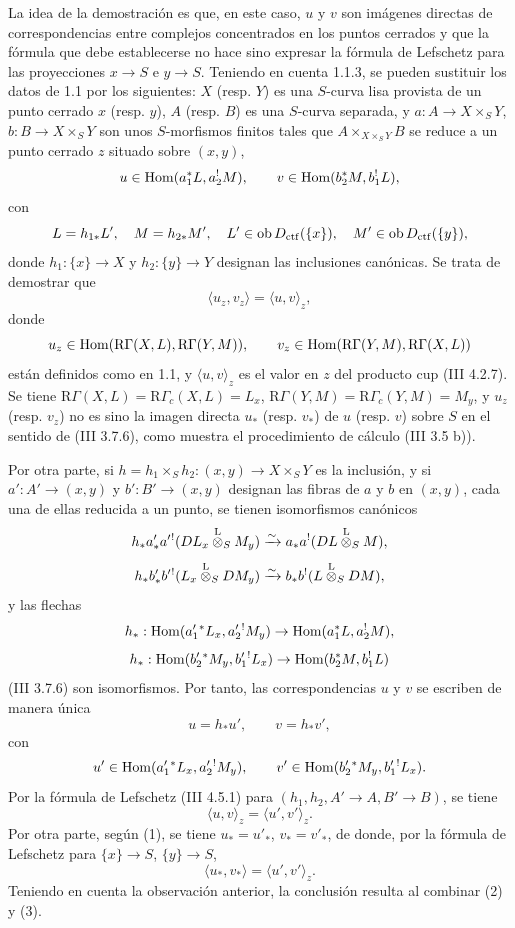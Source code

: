 La idea de la demostración es que, en este caso, $u$ y $v$ son imágenes directas de correspondencias entre complejos concentrados en los puntos cerrados y que la fórmula que debe establecerse no hace sino expresar la fórmula de Lefschetz para las proyecciones $x\to S$ e $y\to S$. Teniendo en cuenta 1.1.3, se pueden sustituir los datos de 1.1 por los siguientes: $X$ (resp. $Y$) es una $S$-curva lisa provista de un punto cerrado $x$ (resp. $y$), $A$ (resp. $B$) es una $S$-curva separada, y $a:A\to X\times_S Y$, $b:B\to X\times_S Y$ son unos $S$-morfismos finitos tales que $A\times_{X\times_SY}B$ se reduce a un punto cerrado $z$ situado sobre $(x,y)$,
\[
u\in\operatorname{Hom}(a_1^*L,a_2^!M),\qquad v\in\operatorname{Hom}(b_2^*M,b_1^!L),
\]
con
\[
L=h_{1*}L',\quad M=h_{2*}M',\quad
L'\in\operatorname{ob} D_{\mathrm{ctf}}(\{x\}),\quad M'\in\operatorname{ob} D_{\mathrm{ctf}}(\{y\}),
\]
donde $h_1:\{x\}\to X$ y $h_2:\{y\}\to Y$ designan las inclusiones canónicas. Se trata de demostrar que
\[
\langle u_z,v_z\rangle=\langle u,v\rangle_z,
\]
donde
\[
u_z\in\operatorname{Hom}(\mathrm R\Gamma(X,L),\mathrm R\Gamma(Y,M)),\qquad
v_z\in\operatorname{Hom}(\mathrm R\Gamma(Y,M),\mathrm R\Gamma(X,L))
\]
están definidos como en 1.1, y $\langle u,v\rangle_z$ es el valor en $z$ del producto cup (III 4.2.7). Se tiene $\mathrm R\Gamma(X,L)=\mathrm R\Gamma_c(X,L)=L_x$, $\mathrm R\Gamma(Y,M)=\mathrm R\Gamma_c(Y,M)=M_y$, y $u_z$ (resp. $v_z$) no es sino la imagen directa $u_*$ (resp. $v_*$) de $u$ (resp. $v$) sobre $S$ en el sentido de (III 3.7.6), como muestra el procedimiento de cálculo (III 3.5 b)).

Por otra parte, si $h=h_1\times_Sh_2:(x,y)\to X\times_SY$ es la inclusión, y si $a':A'\to(x,y)$ y $b':B'\to(x,y)$ designan las fibras de $a$ y $b$ en $(x,y)$, cada una de ellas reducida a un punto, se tienen isomorfismos canónicos
\[
h_*a'_*a'{}^!(DL_x\overset{\mathrm L}{\otimes}_SM_y)
 \xrightarrow{\sim} a_*a^!(DL\overset{\mathrm L}{\otimes}_SM),
\]
\[
h_*b'_*b'{}^!(L_x\overset{\mathrm L}{\otimes}_SDM_y)
 \xrightarrow{\sim} b_*b^!(L\overset{\mathrm L}{\otimes}_SDM),
\]
y las flechas
\[
h_*:\operatorname{Hom}(a_1'{}^*L_x,a_2'{}^!M_y)\to \operatorname{Hom}(a_1^*L,a_2^!M),
\]
\[
h_*:\operatorname{Hom}(b_2'{}^*M_y,b_1'{}^!L_x)\to \operatorname{Hom}(b_2^*M,b_1^!L)
\]
(III 3.7.6) son isomorfismos. Por tanto, las correspondencias $u$ y $v$ se escriben de manera única
\begin{equation}\tag{1}
u=h_*u',\qquad v=h_*v',
\end{equation}
con
\[
u'\in\operatorname{Hom}(a_1'{}^*L_x,a_2'{}^!M_y),\qquad
v'\in\operatorname{Hom}(b_2'{}^*M_y,b_1'{}^!L_x).
\]
Por la fórmula de Lefschetz (III 4.5.1) para $(h_1,h_2,A'\to A,B'\to B)$, se tiene
\begin{equation}\tag{2}
\langle u,v\rangle_z=\langle u',v'\rangle_z .
\end{equation}
Por otra parte, según (1), se tiene $u_*=u'_*$, $v_*=v'_*$, de donde, por la fórmula de Lefschetz para $\{x\}\to S$, $\{y\}\to S$,
\begin{equation}\tag{3}
\langle u_*,v_*\rangle=\langle u',v'\rangle_z .
\end{equation}
Teniendo en cuenta la observación anterior, la conclusión resulta al combinar (2) y (3).
